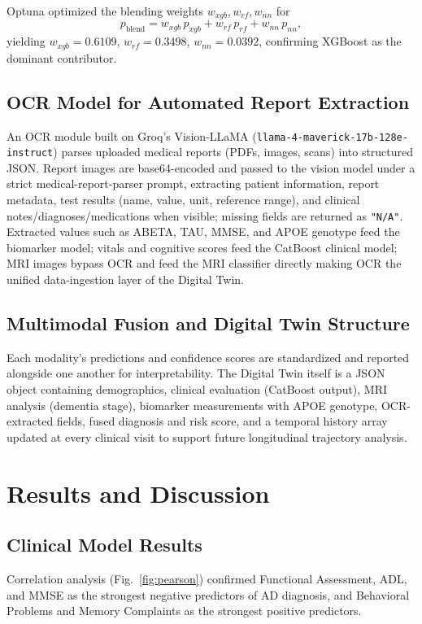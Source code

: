 \documentclass[conference]{IEEEtran}
\begin{document}
Optuna optimized the blending weights $w_{xgb}, w_{rf}, w_{nn}$ for
\[
p_{\text{blend}} = w_{xgb}\, p_{xgb} + w_{rf}\, p_{rf} + w_{nn}\, p_{nn},
\]
yielding $w_{xgb}=0.6109$, $w_{rf}=0.3498$, $w_{nn}=0.0392$, confirming XGBoost as the dominant contributor.

\subsection{OCR Model for Automated Report Extraction}
An OCR module built on Groq's Vision-LLaMA (\texttt{llama-4-maverick-17b-128e-instruct}) parses uploaded medical reports (PDFs, images, scans) into structured JSON. Report images are base64-encoded and passed to the vision model under a strict medical-report-parser prompt, extracting patient information, report metadata, test results (name, value, unit, reference range), and clinical notes/diagnoses/medications when visible; missing fields are returned as \texttt{"N/A"}. Extracted values such as ABETA, TAU, MMSE, and APOE genotype feed the biomarker model; vitals and cognitive scores feed the CatBoost clinical model; MRI images bypass OCR and feed the MRI classifier directly making OCR the unified data-ingestion layer of the Digital Twin.

\subsection{Multimodal Fusion and Digital Twin Structure}
Each modality's predictions and confidence scores are standardized and reported alongside one another for interpretability. The Digital Twin itself is a JSON object containing demographics, clinical evaluation (CatBoost output), MRI analysis (dementia stage), biomarker measurements with APOE genotype, OCR-extracted fields, fused diagnosis and risk score, and a temporal history array  updated at every clinical visit to support future longitudinal trajectory analysis.

\section{Results and Discussion}

\subsection{Clinical Model Results}
Correlation analysis (Fig.~\ref{fig:pearson}) confirmed Functional Assessment, ADL, and MMSE as the strongest negative predictors of AD diagnosis, and Behavioral Problems and Memory Complaints as the strongest positive predictors.
\end{document}
